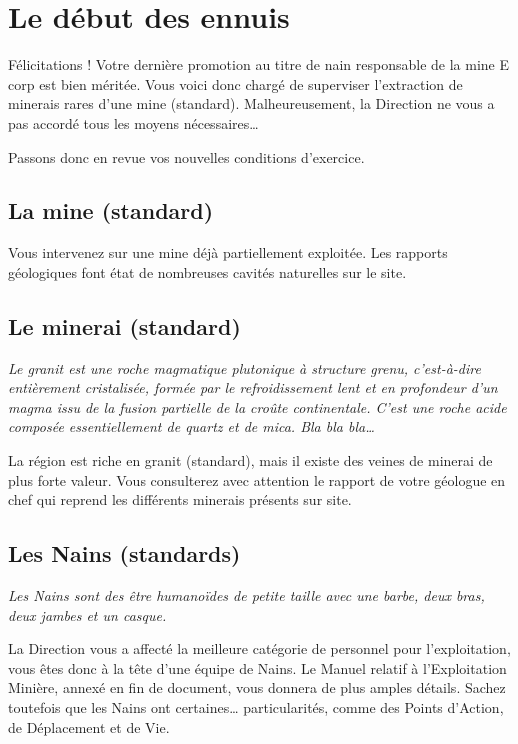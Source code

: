 
\newpage

\section{Le début des ennuis}

Félicitations ! Votre dernière promotion au titre de nain responsable de la mine E corp est bien méritée. Vous voici donc chargé de superviser l'extraction de minerais rares d'une mine (standard). Malheureusement, la Direction ne vous a pas accordé tous les moyens nécessaires\ldots{}

Passons donc en revue vos nouvelles conditions d'exercice.

\subsection{La mine (standard)}
Vous intervenez sur une mine déjà partiellement exploitée. Les rapports géologiques font état de nombreuses cavités naturelles sur le site.

\subsection{Le minerai (standard)}
\textit{Le granit est une roche magmatique plutonique à structure grenu, c'est-à-dire entièrement cristalisée, formée par le refroidissement lent et en profondeur d'un magma issu de la fusion partielle de la croûte continentale. C'est une roche acide composée essentiellement de quartz et de mica. Bla bla bla\ldots{}}

La région est riche en granit (standard), mais il existe des veines de minerai de plus forte valeur. Vous consulterez avec attention le rapport de votre géologue en chef qui reprend les différents minerais présents sur site.

\subsection{Les Nains (standards)}
\textit{Les Nains sont des être humanoïdes de petite taille avec une barbe, deux bras, deux jambes et un casque.}

La Direction vous a affecté la meilleure catégorie de personnel pour l'exploitation, vous êtes donc à la tête d'une équipe de Nains. Le Manuel relatif à l'Exploitation Minière, annexé en fin de document, vous donnera de plus amples détails. Sachez toutefois que les Nains ont certaines\ldots{} particularités, comme des Points d'Action, de Déplacement et de Vie.

